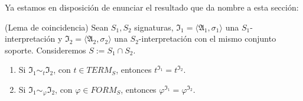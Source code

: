 Ya estamos en disposición de enunciar el resultado que da nombre a esta sección:
\begin{theorem}(Lema de coincidencia)\label{coinc}
Sean $S_1, S_2$ signaturas, $\mathfrak{I}_{1} = \langle \mathfrak{A}_1, \sigma_1 \rangle$ una $S_1$-interpretación y $\mathfrak{I}_{2} = \langle \mathfrak{A}_2, \sigma_2 \rangle$ una $S_2$-interpretación con el mismo conjunto soporte. Consideremos $S := S_1 \cap S_2$.
\begin{enumerate}
    \item Si $\mathfrak{I}_{1} \sim_{t} \mathfrak{I}_{2}$, con $t \in TERM_S$, entonces  $t^{\mathfrak{I}_{1}} = t^{\mathfrak{I}_{2}}$.
    \item Si $\mathfrak{I}_{1} \sim_{\varphi} \mathfrak{I}_{2}$, con $\varphi \in FORM_S$, entonces  $\varphi^{\mathfrak{I}_{1}} = \varphi^{\mathfrak{I}_{2}}$.
\end{enumerate}
\end{theorem}
